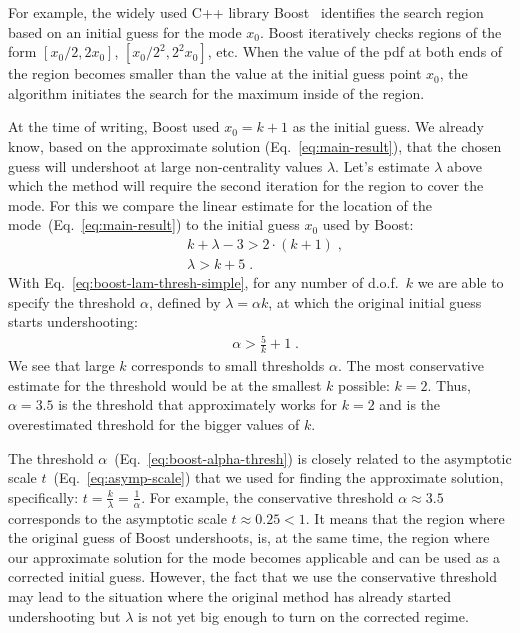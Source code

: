 \documentclass{amsart}
\numberwithin{equation}{section}
\begin{document}
For example, the widely used C++ library Boost~\cite{boost} identifies the search region based on an initial guess for the mode $x_0$. Boost iteratively checks regions of the form $[x_0/2, 2x_0]$,  $[x_0/2^2, 2^2x_0]$, etc. When the value of the pdf at both ends of the region becomes smaller than the value at the initial guess point $x_0$, the algorithm initiates the search for the maximum inside of the region.

At the time of writing, Boost used $x_0 = k + 1$ as the initial guess. We already know, based on the approximate solution (Eq.~\ref{eq:main-result}), that the chosen guess will undershoot at large non-centrality values $\lambda$. Let's estimate $\lambda$ above which the method will require the second iteration for the region to cover the mode. For this we compare the linear estimate for the location of the mode~(Eq.~\ref{eq:main-result}) to the initial guess $x_0$ used by Boost:
%
\begin{align}
    &k + \lambda - 3 > 2 \cdot (k + 1)\;, \\
    &\lambda > k + 5 \label{eq:boost-lam-thresh-simple}\;.
\end{align}
%
With Eq.~\ref{eq:boost-lam-thresh-simple}, for any number of d.o.f.\ $k$ we are able to specify the threshold $\alpha$, defined by $\lambda  = \alpha k$, at which the original initial guess starts undershooting:
%
\begin{align}
    &\alpha > \frac{5}{k} + 1 \label{eq:boost-alpha-thresh}\;.
\end{align}
%
We see that large $k$ corresponds to small thresholds $\alpha$. The most conservative estimate for the threshold would be at the smallest $k$ possible: $k = 2$. Thus, $\alpha = 3.5$ is the threshold that approximately works for $k=2$ and is the overestimated threshold for the bigger values of $k$.

The threshold $\alpha$~(Eq.~\ref{eq:boost-alpha-thresh}) is closely related to the asymptotic scale $t$~(Eq.~\ref{eq:asymp-scale}) that we used for finding the approximate solution, specifically: $t = \frac{k}{\lambda} = \frac{1}{\alpha}$. For example, the conservative threshold $\alpha \approx 3.5$ corresponds to the asymptotic scale $t \approx 0.25 < 1$. It means that the region where the original guess of Boost undershoots, is, at the same time, the region where our approximate solution for the mode becomes applicable and can be used as a corrected initial guess. However, the fact that we use the conservative threshold may lead to the situation where the original method has already started undershooting but $\lambda$ is not yet big enough to turn on the corrected regime.
\end{document}
